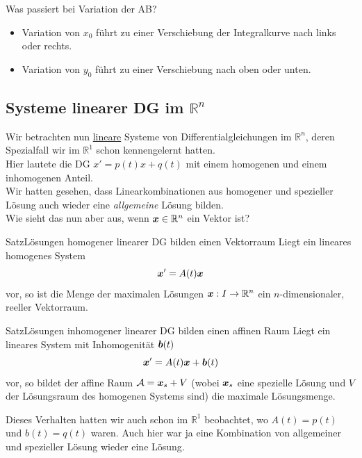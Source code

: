 \begin{Beispiel}
\begin{center}
\end{center}
Was passiert bei Variation der AB?
\begin{itemize}
    \item Variation von $x_0$ führt zu einer Verschiebung der Integralkurve nach links oder rechts.
    \item Variation von $y_0$ führt zu einer Verschiebung nach oben oder unten.
\end{itemize}
\end{Beispiel}


\subsection[Systeme linearer DG]{Systeme linearer DG im $\mathbb{R}^n$}
Wir betrachten nun \underline{lineare} Systeme von Differentialgleichungen im $\mathbb{R}^n$, deren Spezialfall wir im $\mathbb{R}^1$ schon kennengelernt hatten.\\
Hier lautete die DG $x'=p(t)x+q(t)$ mit einem homogenen und einem inhomogenen Anteil.\\
Wir hatten gesehen, dass Linearkombinationen aus homogener und spezieller Lösung auch wieder eine \textit{allgemeine} Lösung bilden.\\
Wie sieht das nun aber aus, wenn ${{\text{\boldmath${x}$}}}\in \mathbb{R}^n$ ein Vektor ist?
\begin{Satz}
{Satz}{Lösungen homogener linearer DG bilden einen Vektorraum}
Liegt ein lineares homogenes System
\begin{equation*}
    {{\text{\boldmath${x}$}}}'=A(t){{\text{\boldmath${x}$}}}
\end{equation*}
vor, so ist die Menge der maximalen Lösungen ${{\text{\boldmath${x}$}}}:I\to\mathbb{R}^n$ ein $n$-dimensionaler, reeller Vektorraum.\\
\end{Satz}
\begin{Satz}
{Satz}{Lösungen inhomogener linearer DG bilden einen affinen Raum}
Liegt ein lineares System mit Inhomogenität ${{\text{\boldmath${b}$}}}(t)$
\begin{equation*}
    {{\text{\boldmath${x}$}}}'=A(t){{\text{\boldmath${x}$}}}+{{\text{\boldmath${b}$}}}(t)
\end{equation*}
vor, so bildet der affine Raum $\mathcal{A}={{\text{\boldmath${x}$}}}_s+V$ (wobei ${{\text{\boldmath${x}$}}}_s$ eine spezielle Lösung und $V$ der Lösungsraum des homogenen Systems sind) die maximale Lösungsmenge.
\end{Satz}
Dieses Verhalten hatten wir auch schon im $\mathbb{R}^1$ beobachtet, wo $A(t)=p(t)$ und $b(t)=q(t)$ waren. Auch hier war ja eine Kombination von allgemeiner und spezieller Lösung wieder eine Lösung.\\
